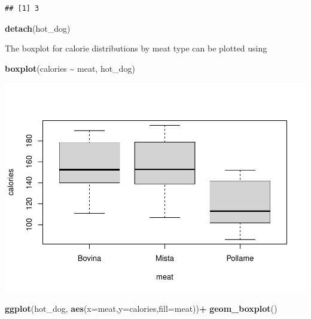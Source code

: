 \documentclass[
]{article}
\newenvironment{Shaded}{\begin{snugshade}}{\end{snugshade}}
\newcommand{\AttributeTok}[1]{\textcolor[rgb]{0.13,0.29,0.53}{#1}}
\newcommand{\FunctionTok}[1]{\textcolor[rgb]{0.13,0.29,0.53}{\textbf{#1}}}
\newcommand{\NormalTok}[1]{#1}
\newcommand{\SpecialCharTok}[1]{\textcolor[rgb]{0.81,0.36,0.00}{\textbf{#1}}}
\begin{document}
\begin{verbatim}
## [1] 3
\end{verbatim}

\begin{Shaded}
\begin{Highlighting}[]
\FunctionTok{detach}\NormalTok{(hot\_dog)}
\end{Highlighting}
\end{Shaded}

The boxplot for calorie distributions by meat type can be plotted using

\begin{Shaded}
\begin{Highlighting}[]
\FunctionTok{boxplot}\NormalTok{(calories }\SpecialCharTok{\textasciitilde{}}\NormalTok{ meat, hot\_dog)}
\end{Highlighting}
\end{Shaded}

\includegraphics{Tests_and_Applications_files/figure-latex/unnamed-chunk-22-1.pdf}

\begin{Shaded}
\begin{Highlighting}[]
\FunctionTok{ggplot}\NormalTok{(hot\_dog, }\FunctionTok{aes}\NormalTok{(}\AttributeTok{x=}\NormalTok{meat,}\AttributeTok{y=}\NormalTok{calories,}\AttributeTok{fill=}\NormalTok{meat))}\SpecialCharTok{+}
  \FunctionTok{geom\_boxplot}\NormalTok{()}
\end{Highlighting}
\end{Shaded}
\end{document}
